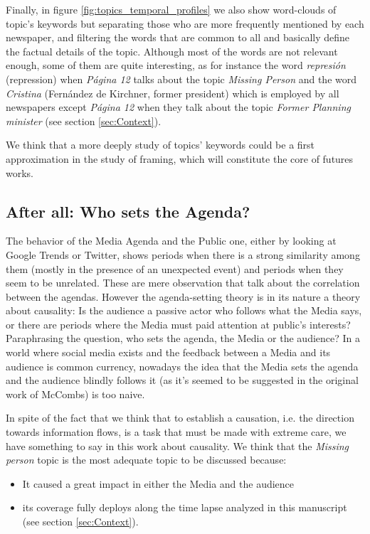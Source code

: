\documentclass[10pt,letterpaper]{article}
\begin{document}
\par Finally, in figure \ref{fig:topics_temporal_profiles} we also show word-clouds of topic's keywords but separating those who are more frequently mentioned by each newspaper, and filtering the words that are common to all and basically define the factual details of the topic.
Although most of the words are not relevant enough, some of them are quite interesting, as for instance the word \emph{represi\'on} (repression) when \emph{P\'agina 12} talks about the topic \emph{Missing Person} and the word \emph{Cristina} (Fern\'andez de Kirchner, former president) which is employed by all newspapers except \emph{P\'agina 12} when they  talk about the topic \emph{Former Planning minister} (see section \ref{sec:Context}).

We think that a more deeply study of topics' keywords could be a first approximation in the study of framing, which will constitute the core of futures works.

\subsection*{After all: Who sets the Agenda?}
\label{sec:who_sets}

\par The behavior of the Media Agenda and the Public one, either by looking at Google Trends or Twitter, shows periods when there is a strong similarity among them (mostly in the presence of an unexpected event) and periods when they seem to be unrelated. These are mere observation that talk about the correlation between the agendas.
However the agenda-setting theory is in its nature a theory about causality: Is the audience a passive actor who follows what the Media says, or there are periods where the Media must paid attention at public's interests?
Paraphrasing the question, who sets the agenda, the Media or the audience?
In a world where social media exists and the feedback between a Media and its audience is common currency, nowadays the idea that the Media sets the agenda and the audience blindly follows it (as it's seemed to be suggested in the original work of McCombs) is too naive.
 
\par In spite of the fact that we think that to establish a causation, i.e. the direction towards information flows, is a task that must be made with extreme care, we have something to say in this work about causality. 
We think that the \emph{Missing person} topic is the most adequate topic to be discussed because:
\begin{itemize} 
\item It caused a great impact in either the Media and the audience
\item  its coverage fully deploys along the time lapse analyzed in this manuscript (see section \ref{sec:Context}).
\end{itemize}
\end{document}

